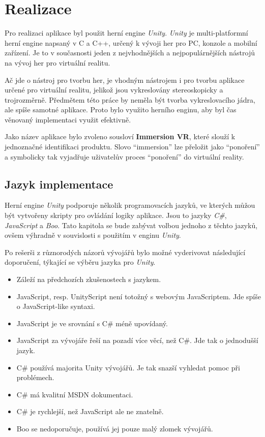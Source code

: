 \chapter{Realizace}\label{realizace}

Pro realizaci aplikace byl použit herní engine \emph{Unity}.
\emph{Unity} je multi-platformní herní engine napsaný v C a C++, určený
k vývoji her pro PC, konzole a mobilní zařízení. Je to v současnosti
jeden z nejvhodnějších a nejpopulárnějších nástrojů na vývoj her pro
virtuální realitu. \autocite{unitypopularity}

Ač jde o nástroj pro tvorbu her, je vhodným nástrojem i pro tvorbu
aplikace určené pro virtuální realitu, jelikož jsou vykreslovány 
stereoskopicky a trojrozměrně. Předmětem této práce by neměla 
být tvorba vykreslovacího jádra, ale spíše samotné aplikace. 
Proto bylo využito herního enginu, aby byl čas
věnovaný implementaci využit efektivně.

Jako název aplikace bylo zvoleno sousloví \textbf{Immersion VR}, které
slouží k jednoznačné identifikaci produktu. Slovo ``immersion'' lze
přeložit jako ``ponoření'' a symbolicky tak vyjadřuje uživatelův proces
``ponoření'' do virtuální reality.

\section{Jazyk implementace}\label{jazyk-implementace}

Herní engine \emph{Unity} podporuje několik programovacích jazyků, ve
kterých můžou být vytvořeny skripty pro ovládání logiky aplikace. Jsou
to jazyky \emph{C\#}, \emph{JavaScript} a \emph{Boo}. \autocite{unitylanguages} Tato kapitola se
bude zabývat volbou jednoho z těchto jazyků, ovšem výhradně v
souvislosti s použitím v enginu \emph{Unity}.

Po rešerši z různorodých názorů vývojářů bylo možné vyderivovat
následující doporučení, týkající se výběru jazyka pro \emph{Unity}. \autocite{languagesresearch1} \autocite{languagesresearch2} \autocite{languagesresearch3}

\begin{itemize}
\tightlist
\item
  Záleží na předchozích zkušenostech s jazykem.
\item
  JavaScript, resp. UnityScript není totožný s webovým JavaScriptem. Jde
  spíše o JavaScript-like syntaxi.
\item
  JavaScript je ve srovnání s C\# méně upovídaný.
\item
  JavaScript za vývojáře řeší na pozadí více věcí, než C\#. Jde tak o
  jednodušší jazyk.
\item
  C\# používá majorita Unity vývojářů. Je tak snazší vyhledat pomoc při
  problémech.
\item
  C\# má kvalitní MSDN dokumentaci.
\item
  C\# je rychlejší, než JavaScript ale ne znatelně.
\item
  Boo se nedoporučuje, používá jej pouze malý zlomek vývojářů.
\end{itemize}

